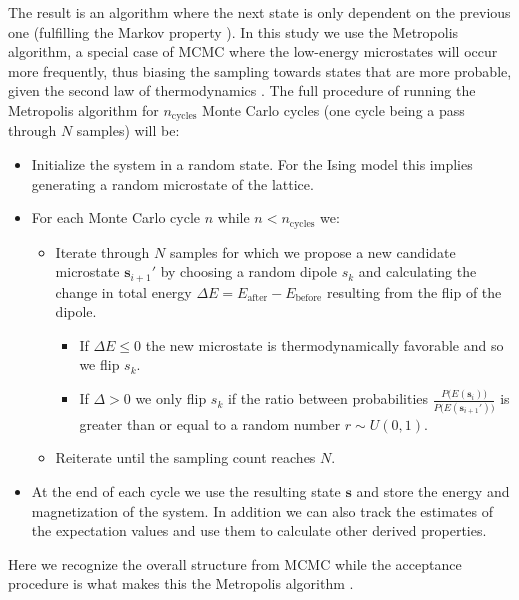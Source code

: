 \documentclass[../main_proj4_correct_template.tex]{subfiles}
\begin{document}
\noindent The result is an algorithm where the next state is only dependent on the previous one (fulfilling the Markov property \cite{Linear_Algebra_and_its_Applications}). In this study we use the Metropolis algorithm, a special case of MCMC where the low-energy microstates will occur more frequently, thus biasing the sampling towards states that are more probable, given the second law of thermodynamics \cite{thermal_physics}. The full procedure of running the Metropolis algorithm for $n_{\operatorname{cycles}}$ Monte Carlo cycles (one cycle being a pass through $N$ samples) will be:

\begin{itemize}
    \item Initialize the system in a random state. For the Ising model this implies generating a random microstate of the lattice.
    \item For each Monte Carlo cycle $n$ while $n < n_{\operatorname{cycles}}$ we:
    \begin{itemize}
        \item Iterate through $N$ samples for which we propose a new candidate microstate $\mathbf{s}_{i+1}'$ by choosing a random dipole $s_k$ and calculating the change in total energy $\Delta E = E_{\operatorname{after}} - E_{\operatorname{before}}$ resulting from the flip of the dipole. 

        \begin{itemize}
            \item If $\Delta E \leq 0$ the new microstate is thermodynamically favorable and so we flip $s_k$. 
            \item If $\Delta > 0$ we only flip $s_k$ if the ratio between probabilities $\frac{P\big(E(\mathbf{s}_i) \big)}{P\big(E(\mathbf{s}_{i+1}') \big)}$ is greater than or equal to a random number $r\sim U(0,1)$.
        \end{itemize}
        
        \item Reiterate until the sampling count reaches $N$.
    \end{itemize}    
    \item At the end of each cycle we use the resulting state $\mathbf{s}$ and store the energy and magnetization of the system. In addition we can also track the estimates of the expectation values and use them to calculate other derived properties.
\end{itemize}

\noindent Here we recognize the overall structure from MCMC while the acceptance procedure is what makes this the Metropolis algorithm \cite{lecture_notes}. 
\end{document}
